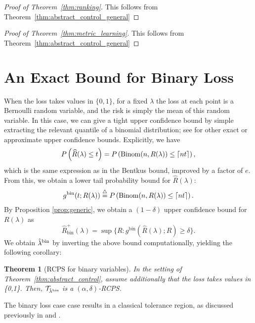 \documentclass[10pt]{article}
\newtheorem{theorem}{Theorem}
\newcommand{\T}{\mathcal{T}}
\newcommand{\lhat}{\hat{\lambda}}
\newcommand{\Rhat}{\widehat{R}}
\newcommand{\triangleq}{\stackrel{\triangle}{=}}
\begin{document}
\begin{proof}[Proof of Theorem~\ref{thm:ranking}]
This follows from Theorem~\ref{thm:abstract_control_general}
\end{proof}

\begin{proof}[Proof of Theorem~\ref{thm:metric_learning}]
This follows from Theorem~\ref{thm:abstract_control_general}
\end{proof}

\section{An Exact Bound for Binary Loss}
\label{app:binary_loss}

When the loss takes values in $\{0,1\}$, for a fixed $\lambda$ the loss at each point is a Bernoulli random variable, and the risk is simply the mean of this random variable. In this case, we can give a tight upper confidence bound by simple extracting the relevant quantile of a binomial distribution; see \cite{brown2001interval} for other exact or approximate upper confidence bounds. Explicitly, we have
\begin{equation}
P\left( \widehat{R}(\lambda) \le t\right) = P\left({\rm Binom}(n,R(\lambda)) \le \lceil nt \rceil\right),
\end{equation}
which is the same expression as in the Bentkus bound, improved by a factor of $e$. From this, we obtain a lower tail probability bound for $\Rhat(\lambda)$:
\begin{align}
g^{\mathrm{bin}}(t; R(\lambda)) \triangleq P\left({\rm Binom}(n,R(\lambda)) \le \lceil nt \rceil\right).
\end{align}
By Proposition \ref{prop:generic}, we obtain a $(1 - \delta)$ upper confidence bound for $R(\lambda)$ as 
\begin{equation*}
\label{eq:Rhat_binary}
\Rhat_{\mathrm{bin}}^+(\lambda) = \sup\Big\{R: g^{\mathrm{bin}}(\Rhat(\lambda); R)\ge \delta\Big\}.
\end{equation*}
We obtain $\lhat^{{\rm bin}}$ by inverting the above bound computationally, yielding the following corollary:
\begin{theorem}[RCPS for binary variables]\label{thm:binary}
    In the setting of Theorem~\ref{thm:abstract_control}, assume additionally that the loss takes values in \{0,1\}. Then, $\T_{\lhat^{{\rm bin}}}$ is a $(\alpha,\delta)$-RCPS.
\end{theorem}
The binary loss case case results in a classical tolerance region, as discussed previously in \cite{vovk2012conditional} and \cite{Park2020PAC}.
\end{document}
